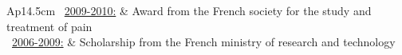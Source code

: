\begin{tabular}{Ap{14.5cm}}
\textbullet~\underline{2009-2010:} & Award from the French society for the study and treatment of pain\\
     
\textbullet~\underline{2006-2009:} & Scholarship from the French ministry of research and technology \\
\end{tabular}

